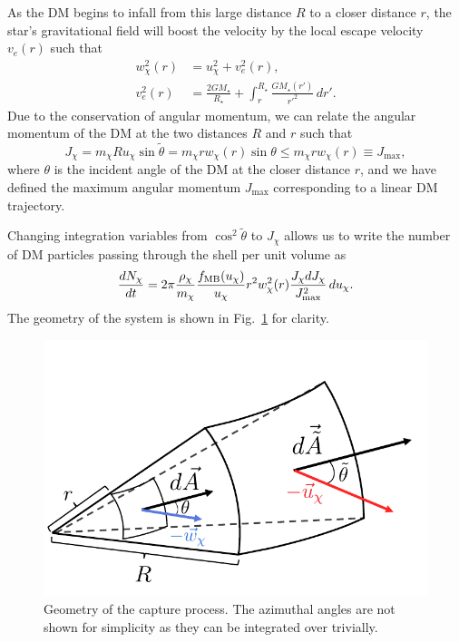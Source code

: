 As the DM begins to infall from this large distance $R$ to a closer distance $r$, the star's gravitational field will boost the velocity by the local escape velocity $v_e(r)$ such that
\begin{align}
    w^2_\chi(r) &= u^2_\chi + v_e^2(r),\\
    v_e^2(r) & = \frac{2 G M_\star}{R_\star} + \int_r^{R_\star} \frac{G M_\star(r')}{r'^2}\,dr'.
\end{align}
Due to the conservation of angular momentum, we can relate the angular momentum of the DM at the two distances $R$ and $r$ such that
\begin{equation}
    J_\chi = m_\chi R u_\chi \sin \tilde\theta = m_\chi r w_\chi(r) \sin\theta \leq m_\chi r w_\chi(r) \equiv J_{\mathrm{max}},
\end{equation}
where $\theta$ is the incident angle of the DM at the closer distance $r$, and we have defined the maximum angular momentum $J_{\mathrm{max}}$ corresponding to a linear DM trajectory.

Changing integration variables from $\cos^2\tilde \theta$ to $J_\chi$ allows us to write the number of DM particles passing through the shell per unit volume as
\begin{equation}
    \frac{dN_\chi}{dt} = 2\pi \frac{\rho_\chi}{m_\chi} \frac{f_{\rm MB}(u_\chi)}{u_\chi} r^2 w_\chi^2(r) \frac{J_\chi dJ_\chi}{J^2_\mathrm{max}}\,du_\chi.\label{eq:shell_flux}
\end{equation}
The geometry of the system is shown in Fig.~\ref{fig:capturegeometry} for clarity.

\begin{figure}
    \centering
    \includegraphics{img/chapter_1/capture_geometry.pdf}
    \caption{Geometry of the capture process. The azimuthal angles are not shown for simplicity as they can be integrated over trivially.}
    \label{fig:capturegeometry}
\end{figure}

